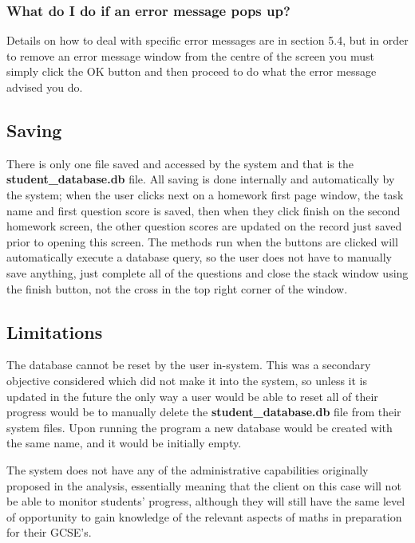 
\subsubsection{What do I do if an error message pops up?}

Details on how to deal with specific error messages are in section 5.4, but in order to remove an error message window from the centre of the screen you must simply click the OK button and then proceed to do what the error message advised you do.







\subsection{Saving}

There is only one file saved and accessed by the system and that is the \textbf{student\_database.db} file. All saving is done internally and automatically by the system; when the user clicks next on a homework first page window, the task name and first question score is saved, then when they click finish on the second homework screen, the other question scores are updated on the record just saved prior to opening this screen. The methods run when the buttons are clicked will automatically execute a database query, so the user does not have to manually save anything, just complete all of the questions and close the stack window using the finish button, not the cross in the top right corner of the window.

\subsection{Limitations}

The database cannot be reset by the user in-system. This was a secondary objective considered which did not make it into the system, so unless it is updated in the future the only way a user would be able to reset all of their progress would be to manually delete the \textbf{student\_database.db} file from their system files. Upon running the program a new database would be created with the same name, and it would be initially empty.

The system does not have any of the administrative capabilities originally proposed in the analysis, essentially meaning that the client on this case will not be able to monitor students' progress, although they will still have the same level of opportunity to gain knowledge of the relevant aspects of maths in preparation for their GCSE's.





